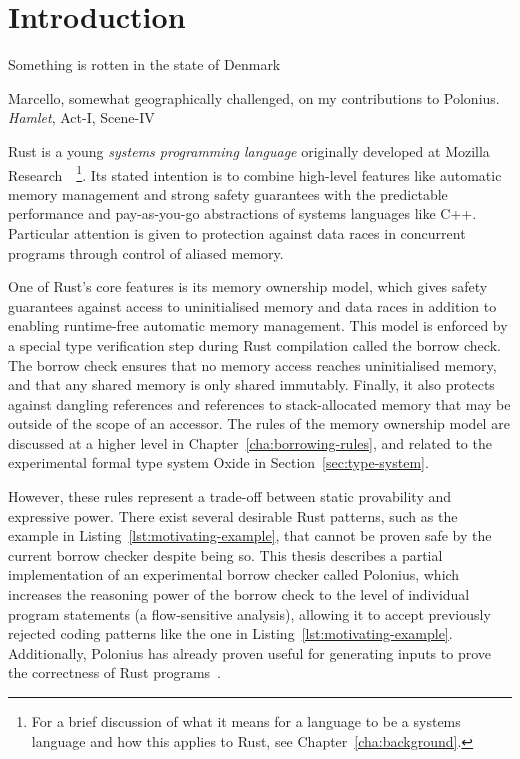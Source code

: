 \documentclass[11pt,a4paper,twoside,openany]{report}
\renewcommand\_{\textunderscore\allowbreak}
\begin{document}
\chapter{Introduction}
\epigraph{Something is rotten in the state of Denmark}%
{Marcello, somewhat geographically challenged, on my contributions to Polonius.
  \textit{Hamlet}, Act-I, Scene-IV}
Rust is a young \textit{systems programming language} originally developed at
Mozilla Research~\cite{matsakis_rust_2014}~\footnote{For a brief discussion of
  what it means for a language to be a systems language and how this applies to
  Rust, see Chapter~\ref{cha:background}.}. Its stated intention is to combine
high-level features like automatic memory management and strong safety
guarantees with the predictable performance and pay-as-you-go abstractions of
systems languages like C++. Particular attention is given to protection against
data races in concurrent programs through control of aliased memory.

One of Rust's core features is its memory ownership model, which gives safety
guarantees against access to uninitialised memory and data races in addition to
enabling runtime-free automatic memory management. This model is enforced by a
special type verification step during Rust compilation called the borrow check.
The borrow check ensures that no memory access reaches uninitialised memory, and
that any shared memory is only shared immutably. Finally, it also protects
against dangling references and references to stack-allocated memory that may be
outside of the scope of an accessor. The rules of the memory ownership model are
discussed at a higher level in Chapter~\ref{cha:borrowing-rules}, and related to
the experimental formal type system Oxide in Section~\ref{sec:type-system}.

However, these rules represent a trade-off between static provability and
expressive power. There exist several desirable Rust patterns, such as the
example in Listing~\ref{lst:motivating-example}, that cannot be proven safe by
the current borrow checker despite being so. This thesis describes a partial
implementation of an experimental borrow checker called Polonius, which
increases the reasoning power of the borrow check to the level of individual
program statements (a flow-sensitive analysis), allowing it to accept previously
rejected coding patterns like the one in Listing~\ref{lst:motivating-example}.
Additionally, Polonius has already proven useful for generating inputs to prove
the correctness of Rust programs~\cite{Astrauskas:2019:LRT:3366395.3360573}.
\end{document}
